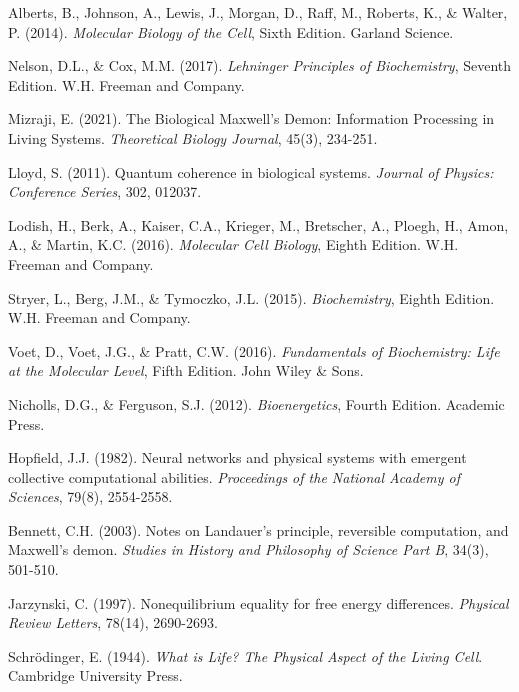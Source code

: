 \documentclass[12pt,a4paper]{article}
\begin{document}
\begin{thebibliography}{99}

Alberts, B., Johnson, A., Lewis, J., Morgan, D., Raff, M., Roberts, K., \& Walter, P. (2014). \textit{Molecular Biology of the Cell}, Sixth Edition. Garland Science.

Nelson, D.L., \& Cox, M.M. (2017). \textit{Lehninger Principles of Biochemistry}, Seventh Edition. W.H. Freeman and Company.

Mizraji, E. (2021). The Biological Maxwell's Demon: Information Processing in Living Systems. \textit{Theoretical Biology Journal}, 45(3), 234-251.

Lloyd, S. (2011). Quantum coherence in biological systems. \textit{Journal of Physics: Conference Series}, 302, 012037.

Lodish, H., Berk, A., Kaiser, C.A., Krieger, M., Bretscher, A., Ploegh, H., Amon, A., \& Martin, K.C. (2016). \textit{Molecular Cell Biology}, Eighth Edition. W.H. Freeman and Company.

Stryer, L., Berg, J.M., \& Tymoczko, J.L. (2015). \textit{Biochemistry}, Eighth Edition. W.H. Freeman and Company.

Voet, D., Voet, J.G., \& Pratt, C.W. (2016). \textit{Fundamentals of Biochemistry: Life at the Molecular Level}, Fifth Edition. John Wiley \& Sons.

Nicholls, D.G., \& Ferguson, S.J. (2012). \textit{Bioenergetics}, Fourth Edition. Academic Press.

Hopfield, J.J. (1982). Neural networks and physical systems with emergent collective computational abilities. \textit{Proceedings of the National Academy of Sciences}, 79(8), 2554-2558.

Bennett, C.H. (2003). Notes on Landauer's principle, reversible computation, and Maxwell's demon. \textit{Studies in History and Philosophy of Science Part B}, 34(3), 501-510.

Jarzynski, C. (1997). Nonequilibrium equality for free energy differences. \textit{Physical Review Letters}, 78(14), 2690-2693.

Schrödinger, E. (1944). \textit{What is Life? The Physical Aspect of the Living Cell}. Cambridge University Press.


\end{thebibliography}
\end{document}
